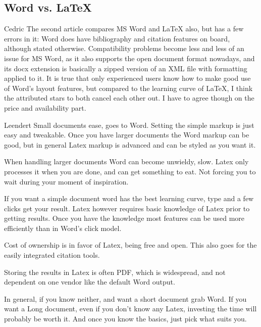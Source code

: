 \subsection{Word vs. LaTeX}

\begin{cquote}{Cedric}
The second article compares MS Word and LaTeX also, but has a few errors in it: Word does have bibliography and citation features on board, although stated otherwise. Compatibility problems become less and less of an issue for MS Word, as it also supports the open document format nowadays, and its docx extension is basically a zipped version of an XML file with formatting applied to it. It is true that only experienced users know how to make good use of Word's layout features, but compared to the learning curve of LaTeX, I think the attributed stars to both cancel each other out. I have to agree though on the price and availability part.
\end{cquote}

\begin{cquote}{Leendert}
Small documents ease, goes to Word. Setting the simple markup is just easy and tweakable. Once you have larger documents the Word markup can be good, but in general Latex markup is advanced and can be styled as you want it.

\vspace{10pt}
When handling larger documents Word can become unwieldy, slow. Latex only processes it when you are done, and can get something to eat. Not forcing you to wait during your moment of inspiration.

\vspace{10pt}
If you want a simple document word has the best learning curve, type and a few clicks get your result. Latex however requires basic knowledge of Latex prior to getting results. Once you have the knowledge most features can be used more efficiently than in Word's click model.

\vspace{10pt}
Cost of ownership is in favor of Latex, being free and open. This also goes for the easily integrated citation tools.

\vspace{10pt}
Storing the results in Latex is often PDF, which is widespread, and not dependent on one vendor like the default Word output.

\vspace{10pt}
In general, if you know neither, and want a short document grab Word. If you want a Long document, even if you don't know any Latex, investing the time will probably be worth it. And once you know the basics, just pick what suits you.
\end{cquote}

